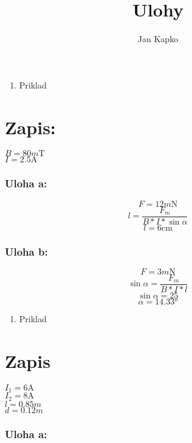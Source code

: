 \documentclass[
]{article}
\title{Ulohy}
\author{Jan Kapko}
\date{}
\providecommand{\tightlist}{%
  \setlength{\itemsep}{0pt}\setlength{\parskip}{0pt}}
\begin{document}
\maketitle

\begin{enumerate}
\def\labelenumi{\arabic{enumi}.}
\tightlist
\item
  Priklad
\end{enumerate}

\hypertarget{zapis}{%
\section{Zapis:}\label{zapis}}

\(B = 80m\si{\tesla}\)\\
\(I = 2.5\si{\ampere}\)

\hypertarget{uloha-a}{%
\subsubsection{Uloha a:}\label{uloha-a}}

\[F = 12m\si{\newton}\] \[l = \frac{F_m}{B * I * \sin\alpha}\]
\[l = 6\si{\cm}\]

\hypertarget{uloha-b}{%
\subsubsection{Uloha b:}\label{uloha-b}}

\[F = 3m\si{\newton}\] \[\sin\alpha = \frac{F_m}{B * I * l}\]
\[\sin\alpha = 25\] \[\alpha = \ang{14,33}\]

\begin{enumerate}
\def\labelenumi{\arabic{enumi}.}
\setcounter{enumi}{1}
\tightlist
\item
  Priklad
\end{enumerate}

\hypertarget{zapis-1}{%
\section{Zapis}\label{zapis-1}}

\(I_1 = 6\si{\ampere}\)\\
\(I_2 = 8\si{\ampere}\)\\
\(l = 0.85m\)\\
\(d = 0.12m\)\\

\hypertarget{uloha-a-1}{%
\subsubsection{Uloha a:}\label{uloha-a-1}}
\end{document}
